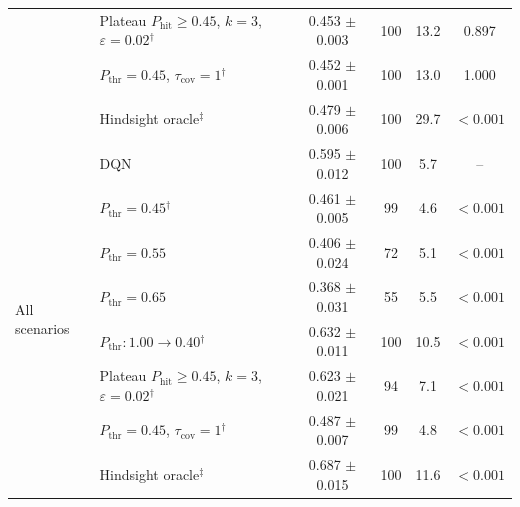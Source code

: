 \begin{table}[htbp]
\begin{tabular}{llcccc}
 & Plateau $P_{\mathrm{hit}}\geq0.45$, $k=3$, $\varepsilon=0.02$$^{\dagger}$ & 0.453 $\pm$ 0.003 & 100 & 13.2 & 0.897 \\
 & $P_{\mathrm{thr}}=0.45$, $\tau_{\mathrm{cov}}=1$$^{\dagger}$ & 0.452 $\pm$ 0.001 & 100 & 13.0 & 1.000 \\
 & Hindsight oracle$^{\ddagger}$ & 0.479 $\pm$ 0.006 & 100 & 29.7 & $<0.001$ \\
\midrule
\multirow{8}{*}{All scenarios} & DQN & 0.595 $\pm$ 0.012 & 100 & 5.7 & -- \\
 & $P_{\mathrm{thr}}=0.45$$^{\dagger}$ & 0.461 $\pm$ 0.005 & 99 & 4.6 & $<0.001$ \\
 & $P_{\mathrm{thr}}=0.55$ & 0.406 $\pm$ 0.024 & 72 & 5.1 & $<0.001$ \\
 & $P_{\mathrm{thr}}=0.65$ & 0.368 $\pm$ 0.031 & 55 & 5.5 & $<0.001$ \\
 & $P_{\mathrm{thr}}: 1.00 \to 0.40$$^{\dagger}$ & 0.632 $\pm$ 0.011 & 100 & 10.5 & $<0.001$ \\
 & Plateau $P_{\mathrm{hit}}\geq0.45$, $k=3$, $\varepsilon=0.02$$^{\dagger}$ & 0.623 $\pm$ 0.021 & 94 & 7.1 & $<0.001$ \\
 & $P_{\mathrm{thr}}=0.45$, $\tau_{\mathrm{cov}}=1$$^{\dagger}$ & 0.487 $\pm$ 0.007 & 99 & 4.8 & $<0.001$ \\
 & Hindsight oracle$^{\ddagger}$ & 0.687 $\pm$ 0.015 & 100 & 11.6 & $<0.001$ \\
\bottomrule
\end{tabular}
\end{table}
